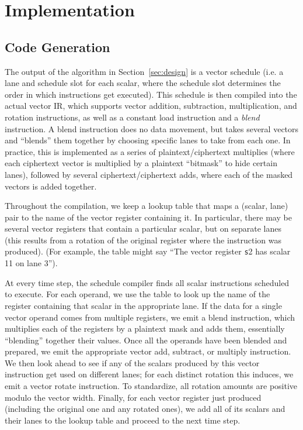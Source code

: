 \section{Implementation}\label{sec:implementation}
\subsection{Code Generation}
The output of the algorithm in Section~\ref{sec:design} is a vector schedule (i.e. a lane and schedule slot for each scalar, where the schedule slot determines the order in which instructions get executed).
This schedule is then compiled into the actual vector IR, which supports vector addition, subtraction, multiplication, and rotation instructions, as well as a constant load instruction and a {\em blend} instruction.
A blend instruction does no data movement, but takes several vectors and ``blends'' them together by choosing specific lanes to take from each one.
In practice, this is implemented as a series of plaintext/ciphertext multiplies (where each ciphertext vector is multiplied by a plaintext ``bitmask'' to hide certain lanes), followed by several ciphertext/ciphertext adds, where each of the masked vectors is added together.

Throughout the compilation, we keep a lookup table that maps a (scalar, lane) pair to the name of the vector register containing it.
In particular, there may be several vector registers that contain a particular scalar, but on separate lanes (this results from a rotation of the original register where the instruction was produced).
(For example, the table might say ``The vector register {\texttt s2} has scalar 11 on lane 3'').

At every time step, the schedule compiler finds all scalar instructions scheduled to execute.
For each operand, we use the table to look up the name of the register containing that scalar in the appropriate lane.
If the data for a single vector operand comes from multiple registers, we emit a blend instruction, which multiplies each of the registers by a plaintext mask and adds them, essentially ``blending'' together their values.
Once all the operands have been blended and prepared, we emit the appropriate vector add, subtract, or multiply instruction.
We then look ahead to see if any of the scalars produced by this vector instruction get used on different lanes; for each distinct rotation this induces, we emit a vector rotate instruction.
To standardize, all rotation amounts are positive modulo the vector width.
Finally, for each vector register just produced (including the original one and any rotated ones), we add all of its scalars and their lanes to the lookup table and proceed to the next time step.

